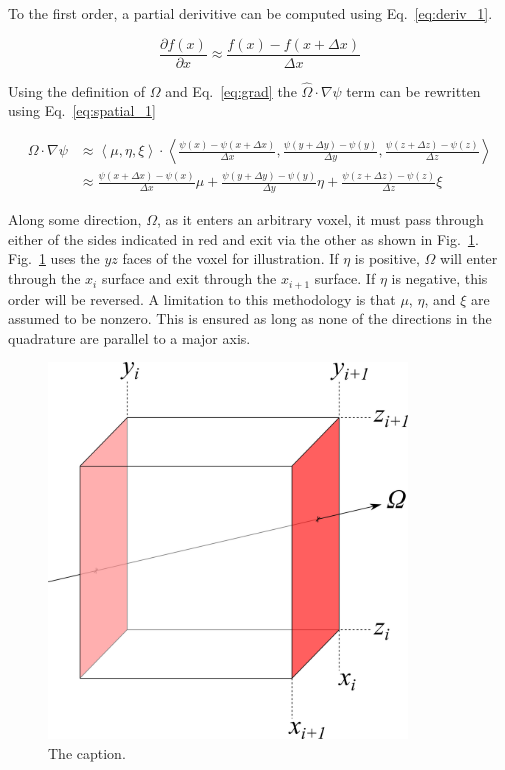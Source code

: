 To the first order, a partial derivitive can be computed using Eq.~\ref{eq:deriv_1}.

\begin{equation} \label{eq:deriv_1}
\frac{\partial f(x)}{\partial x} \approx \frac{f(x) - f(x + \Delta x)}{\Delta x}
\end{equation}

Using the definition of $\Omega$ and Eq.~\ref{eq:grad} the $\hat{\Omega} \cdot \nabla \psi$ term can be rewritten using Eq.~\ref{eq:spatial_1}

\begin{equation} \label{eq:spatial_1}
\begin{split}
\Omega \cdot \nabla \psi & \approx 
\left\langle \mu, \eta, \xi \right\rangle \cdot
\left\langle \frac{\psi(x) - \psi(x + \Delta x)}{\Delta x},
\frac{\psi(y + \Delta y) - \psi(y)}{\Delta y},
\frac{\psi(z + \Delta z) - \psi(z)}{\Delta z} \right\rangle \\
& \approx 
\frac{\psi(x + \Delta x) - \psi(x)}{\Delta x} \mu + 
\frac{\psi(y + \Delta y) - \psi(y)}{\Delta y} \eta + 
\frac{\psi(z + \Delta z) - \psi(z)}{\Delta z} \xi
\end{split}
\end{equation}

Along some direction, $\Omega$, as it enters an arbitrary voxel, it must pass through either of the sides indicated in red and exit via the other as shown in Fig.~\ref{fig:gradient}. Fig.~\ref{fig:gradient} uses the $yz$ faces of the voxel for illustration. If $\eta$ is positive, $\Omega$ will enter through the $x_i$ surface and exit through the $x_{i+1}$ surface. If $\eta$ is negative, this order will be reversed. A limitation to this methodology is that $\mu$, $\eta$, and $\xi$ are assumed to be nonzero. This is ensured as long as none of the directions in the quadrature are parallel to a major axis.

\begin{figure}[tb]
  \begin{center}
   \includegraphics[width=3.75in]{figs/gradient}
  \end{center}
  \caption{The caption.}
\label{fig:gradient}
\end{figure}%


